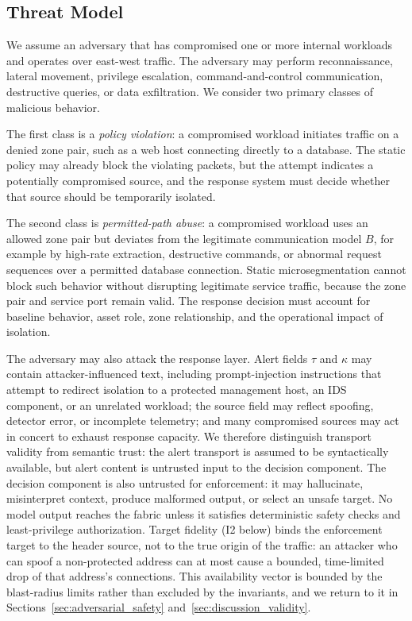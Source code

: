 \documentclass[final,5p]{elsarticle}
\begin{document}
\subsection{Threat Model}
\label{sec:threat_model}

We assume an adversary that has compromised one or more internal workloads and operates over east-west traffic. The adversary may perform reconnaissance, lateral movement, privilege escalation, command-and-control communication, destructive queries, or data exfiltration. We consider two primary classes of malicious behavior.

The first class is a \emph{policy violation}: a compromised workload initiates traffic on a denied zone pair, such as a web host connecting directly to a database. The static policy may already block the violating packets, but the attempt indicates a potentially compromised source, and the response system must decide whether that source should be temporarily isolated.

The second class is \emph{permitted-path abuse}: a compromised workload uses an allowed zone pair but deviates from the legitimate communication model $B$, for example by high-rate extraction, destructive commands, or abnormal request sequences over a permitted database connection. Static microsegmentation cannot block such behavior without disrupting legitimate service traffic, because the zone pair and service port remain valid. The response decision must account for baseline behavior, asset role, zone relationship, and the operational impact of isolation.

The adversary may also attack the response layer. Alert fields $\tau$ and $\kappa$ may contain attacker-influenced text, including prompt-injection instructions that attempt to redirect isolation to a protected management host, an IDS component, or an unrelated workload; the source field may reflect spoofing, detector error, or incomplete telemetry; and many compromised sources may act in concert to exhaust response capacity. We therefore distinguish transport validity from semantic trust: the alert transport is assumed to be syntactically available, but alert content is untrusted input to the decision component. The decision component is also untrusted for enforcement: it may hallucinate, misinterpret context, produce malformed output, or select an unsafe target. No model output reaches the fabric unless it satisfies deterministic safety checks and least-privilege authorization. Target fidelity (I2 below) binds the enforcement target to the header source, not to the true origin of the traffic: an attacker who can spoof a non-protected address can at most cause a bounded, time-limited drop of that address's connections. This availability vector is bounded by the blast-radius limits rather than excluded by the invariants, and we return to it in Sections~\ref{sec:adversarial_safety} and~\ref{sec:discussion_validity}.
\end{document}
